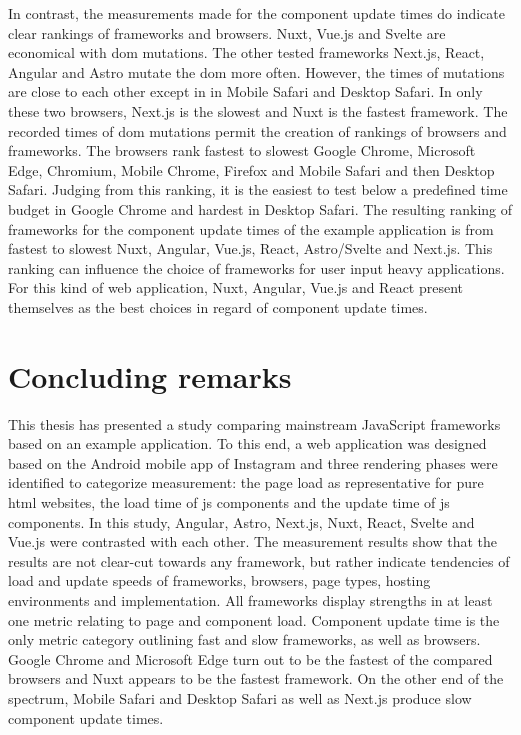 \documentclass[a4paper, 12pt]{article}
\begin{document}
In contrast, the measurements made for the component update times do indicate clear rankings of frameworks and browsers.
Nuxt, Vue.js and Svelte are economical with \acrshort{dom} mutations.
The other tested frameworks Next.js, React, Angular and Astro mutate the \acrshort{dom} more often.
However, the times of mutations are close to each other except in in Mobile Safari and Desktop Safari.
In only these two browsers, Next.js is the slowest and Nuxt is the fastest framework.
The recorded times of \acrshort{dom} mutations permit the creation of rankings of browsers and frameworks.
The browsers rank fastest to slowest Google Chrome, Microsoft Edge, Chromium, Mobile Chrome, Firefox and Mobile Safari and then Desktop Safari.
Judging from this ranking, it is the easiest to test below a predefined time budget in Google Chrome and hardest in Desktop Safari.
The resulting ranking of frameworks for the component update times of the example application is from fastest to slowest Nuxt, Angular, Vue.js, React, Astro/Svelte and Next.js.
This ranking can influence the choice of frameworks for user input heavy applications.
For this kind of web application, Nuxt, Angular, Vue.js and React present themselves as the best choices in regard of component update times.

\section{Concluding remarks}\label{sec:conclusion}

This thesis has presented a study comparing mainstream JavaScript frameworks based on an example application.
To this end, a web application was designed based on the Android mobile app of Instagram and three rendering phases were identified to categorize measurement: the page load as representative for pure \acrshort{html} websites, the load time of \acrlong{js} components and the update time of \acrlong{js} components.
In this study, Angular, Astro, Next.js, Nuxt, React, Svelte and Vue.js were contrasted with each other.
The measurement results show that the results are not clear-cut towards any framework, but rather indicate tendencies of load and update speeds of frameworks, browsers, page types, hosting environments and implementation.
All frameworks display strengths in at least one metric relating to page and component load.
Component update time is the only metric category outlining fast and slow frameworks, as well as browsers.
Google Chrome and Microsoft Edge turn out to be the fastest of the compared browsers and Nuxt appears to be the fastest framework.
On the other end of the spectrum, Mobile Safari and Desktop Safari as well as Next.js produce slow component update times.
\end{document}
